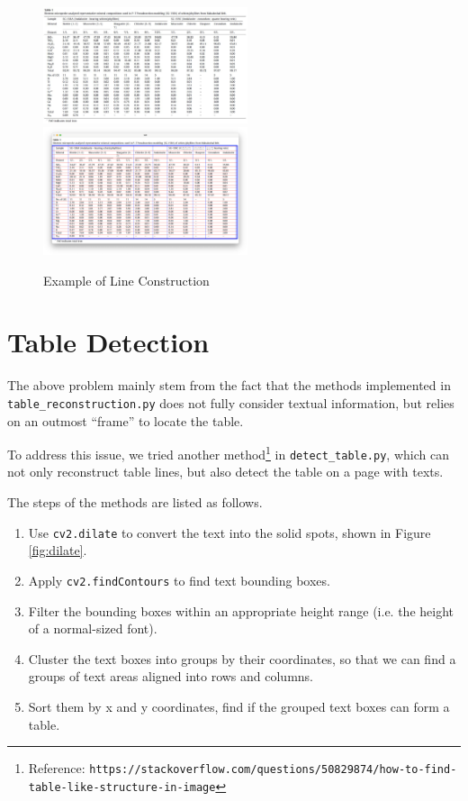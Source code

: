 \begin{figure}[ht]
    \begin{center}
    \includegraphics[width=6cm]{img/line1_org.JPG}
    \includegraphics[width=6cm]{img/line1.png}
    \caption{Example of Line Construction}
    \label{fig:line2}
    \end{center}
  \end{figure}

\section{Table Detection}

The above problem mainly stem from the fact that the methods implemented in \texttt{table\_reconstruction.py} does not fully consider textual information, but relies on an outmost ``frame'' to locate the table.

To address this issue, we tried another method\footnote{Reference: \texttt{https://stackoverflow.com/questions/50829874/how-to-find-table-like-structure-in-image}} in \texttt{detect\_table.py}, which can not only reconstruct table lines, but also detect the table on a page with texts.

The steps of the methods are listed as follows.

\begin{enumerate}
    \item Use \texttt{cv2.dilate} to convert the text into the solid spots, shown in Figure \ref{fig:dilate}.
    \item Apply \texttt{cv2.findContours} to find text bounding boxes.
    \item Filter the bounding boxes within an appropriate height range (i.e. the height of a normal-sized font).
    \item Cluster the text boxes into groups by their coordinates, so that we can find a groups of text areas aligned into rows and columns.
    \item Sort them by x and y coordinates, find if the grouped text boxes can form a table.
\end{enumerate}


